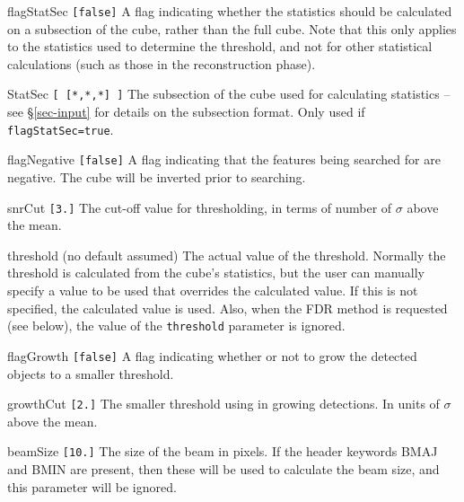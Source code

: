 \begin{entry}
\item[flagStatSec \texttt{[false]}] A flag indicating whether the
  statistics should be calculated on a subsection of the cube, rather
  than the full cube. Note that this only applies to the statistics
  used to determine the threshold, and not for other statistical
  calculations (such as those in the reconstruction phase).
\item[StatSec \texttt{[ [*,*,*] ]}] The subsection of the cube used
  for calculating statistics -- see \S\ref{sec-input} for details on
 the subsection format. Only used if \texttt{flagStatSec=true}.
\item[flagNegative \texttt{[false]}] A flag indicating that the
  features being searched for are negative. The cube will be inverted
  prior to searching.
\item[snrCut \texttt{[3.]}] The cut-off value for thresholding, in
  terms of number of $\sigma$ above the mean.
\item[threshold (no default assumed)] The actual value of the
  threshold. Normally the threshold is calculated from the cube's
  statistics, but the user can manually specify a value to be used
  that overrides the calculated value. If this is not specified, the
  calculated value is used. Also, when the FDR method is requested
  (see below), the value of the \texttt{threshold} parameter is
  ignored. 
\item[flagGrowth \texttt{[false]}] A flag indicating whether or not to
  grow the detected objects to a smaller threshold.
\item[growthCut \texttt{[2.]}] The smaller threshold using in growing
  detections. In units of $\sigma$ above the mean.
\item[beamSize \texttt{[10.]}] The size of the beam in pixels. If the
  header keywords BMAJ and BMIN are present, then these will be used
  to calculate the beam size, and this parameter will be ignored. 
\end{entry}


